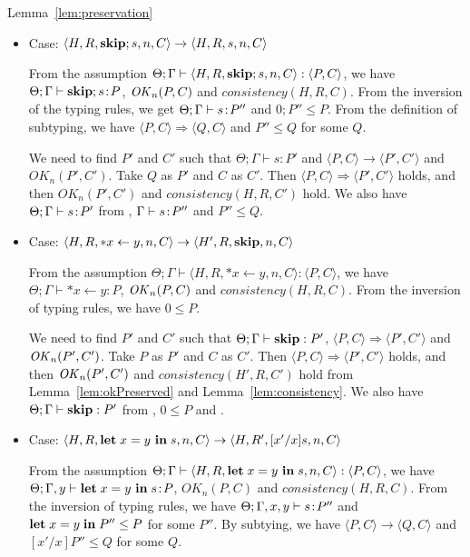 \begin{pfof}{Lemma~\ref{lem:preservation}}
\begin{itemize}
\item Case: \( \langle H, R, \mathbf{skip};s, n, C \rangle \rightarrow \langle
  H, R, s, n, C \rangle \)

  From the assumption \( \Theta; \Gamma \vdash \langle H, R, \mathbf{skip};s,
  n, C \rangle : \langle P, C \rangle\), we have \(\Theta;\Gamma
  \vdash \mathbf{skip};s\!:\! P\), \(\mathit{OK}_{n}(P, C)\) and \(consistency(H, R,
  C)\). From the inversion of the typing rules, we get \(\Theta;
  \Gamma \vdash s\!:\! P''\) and \(0;P'' \le P\). From the definition
  of subtyping, we have \( \langle P, C \rangle \Longrightarrow
  \langle Q, C \rangle\) and \(P'' \le Q\) for some \(Q\).

  We need to find \(P'\) and \(C'\) such that \(\Theta; \Gamma \vdash
  s : P'\) and \(\langle P, C \rangle \rightarrow \langle P', C'
  \rangle\) and \(OK_n(P', C')\). Take \(Q\) as \(P'\) and \(C\) as
  \(C'\). Then \(\langle P, C\rangle \Longrightarrow \langle P', C'
  \rangle\) holds, and then \(OK_n(P', C')\) and \(consistency(H, R,
  C')\) hold. We also have \(\Theta;\Gamma \vdash s\!:\! P'\) from
  , \(\Gamma \vdash s\!:\! P''\) and \(P'' \le Q\).

\item Case: \( \langle H, R, *x \leftarrow y , n, C\rangle \rightarrow
  \langle H', R, \mathbf{skip}, n, C\rangle \)

  From the assumption \( \Theta; \Gamma \vdash \langle H, R, *x
  \leftarrow y, n, C \rangle : \langle P, C \rangle\), we have
  \(\Theta; \Gamma \vdash *x \leftarrow y : P\), \(\mathit{OK}_{n}(P, C)\) and
  \(consistency(H, R, C)\). From the inversion of typing rules, we
  have \(0 \le P\).

  We need to find \(P'\) and \(C'\) such that \(\Theta; \Gamma
  \vdash \mathbf{skip}: P'\), \( \langle P, C \rangle \Longrightarrow \langle
  P', C' \rangle \) and \(\mathit{OK}_n(P', C')\). Take \(P\) as \(P'\) and
  \(C\) as \(C'\). Then \( \langle P, C\rangle \Longrightarrow \langle
  P', C'\rangle\) holds, and then \(\mathit{OK}_n(P', C')\) and
  \(consistency(H', R, C')\) hold from Lemma~\ref{lem:okPreserved} and
  Lemma~\ref{lem:consistency}. We also have \(\Theta; \Gamma
  \vdash \mathbf{skip}: P'\) from , \(0 \le P\) and .

\item Case: \( \langle H, R, \mathbf{let}\; x = y\ \mathbf{in}\; s , n, C \rangle
  \rightarrow \langle H, R', [x'/x]s, n, C \rangle \)

  From the assumption \( \Theta; \Gamma \vdash \langle H, R, \mathbf{let}\; x =
  y\ \mathbf{in}\; s, n, C \rangle : \langle P, C \rangle\), we have \(\Theta;
  \Gamma, y \vdash \mathbf{let}\; x = y \ \mathbf{in}\; s \!:\! P\), \(OK_{n}(P, C)\) and
  \(consistency(H, R, C)\). From the inversion of typing rules, we
  have \(\Theta; \Gamma, x,y \vdash s\!:\! P''\) and \( \mathbf{let}\; x = y\;
  \mathbf{in}\; P'' \le P\) for some \(P''\). By subtying, we have \( \langle P,
  C \rangle \rightarrow \langle Q, C \rangle \) and \([x'/x]P'' \le
  Q\) for some \(Q\).


\end{itemize}
\end{pfof}

